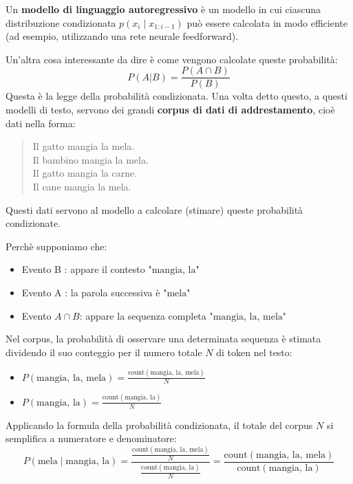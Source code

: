 \newpage
Un \textbf{modello di linguaggio autoregressivo} è un modello in cui ciascuna distribuzione condizionata $p(x_i \mid x_{1:i-1})$ può essere calcolata in modo efficiente (ad esempio, utilizzando una rete neurale feedforward).

Un'altra cosa interessante da dire è come vengono calcolate queste probabilità:
\begin{equation}
    P(A | B) = \frac{P(A \cap B)}{P(B)}
\end{equation}
Questa è la legge della probabilità condizionata.
Una volta detto questo, a questi modelli di testo, servono dei grandi \textbf{corpus di dati di addrestamento}, cioè dati nella forma:
\begin{quote}
Il gatto mangia la mela. \\
Il bambino mangia la mela. \\
Il gatto mangia la carne. \\
Il cane mangia la mela. \\
\end{quote}
Questi dati servono al modello a calcolare (stimare) queste probabilità condizionate.

Perchè supponiamo che:
\begin{itemize}
    \item Evento B :  appare il contesto $\text{"mangia, la"}$
    \item Evento A :  la parola successiva è $\text{"mela"}$
    \item Evento $A \cap B$: appare la sequenza completa $\text{"mangia, la, mela"}$
\end{itemize}
Nel corpus, la probabilità di osservare una determinata sequenza è stimata dividendo il suo conteggio per il numero totale $N$ di token nel testo:
\begin{itemize}
    \item $P(\text{mangia, la, mela}) = \frac{\text{count}(\text{mangia, la, mela})}{N}$
    \item $P(\text{mangia, la}) = \frac{\text{count}(\text{mangia, la})}{N}$
\end{itemize}
Applicando la formula della probabilità condizionata, il totale del corpus $N$ si semplifica a numeratore e denominatore:
\begin{equation}
    P(\text{mela} \mid \text{mangia, la}) = \frac{\frac{\text{count}(\text{mangia, la, mela})}{N}}{\frac{\text{count}(\text{mangia, la})}{N}} = \frac{\text{count}(\text{mangia, la, mela})}{\text{count}(\text{mangia, la})}
\end{equation}


